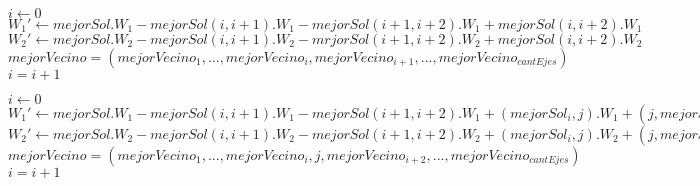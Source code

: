 \begin{flushleft}
 \begin{figure}[H]
  \begin{pseudo}
   \State $i \leftarrow 0$
	  \State $W_1' \leftarrow mejorSol.W_1 - mejorSol(i,i+1).W_1 - mejorSol(i+1,i+2).W_1 + mejorSol(i,i+2).W_1$
	  \State $W_2' \leftarrow mejorSol.W_2 - mejorSol(i,i+1).W_2 - mrjorSol(i+1,i+2).W_2 + mejorSol(i,i+2).W_2$
	    \State $mejorVecino = (mejorVecino_1, ... ,mejorVecino_i, mejorVecino_{i+1}, ..., mejorVecino_{cantEjes})$
	  \EndIf
      \EndIf
      \State $i = i+1$
   \EndWhile
   \EndProcedure
  \end{pseudo}
 \end{figure}
\end{flushleft}

\begin{flushleft}
 \begin{figure}[H]
  \begin{pseudo}
   \State $i \leftarrow 0$
	  \State $W_1' \leftarrow mejorSol.W_1 - mejorSol(i,i+1).W_1 - mejorSol(i+1,i+2).W_1 + (mejorSol_i, j).W_1 + (j, mejorSol_{i+2}).W_1$
	  \State $W_2' \leftarrow mejorSol.W_2 - mejorSol(i,i+1).W_2 - mejorSol(i+1,i+2).W_2 + (mejorSol_i, j).W_2 + (j, mejorSol_{i+2}).W_2$
	    \State $mejorVecino = (mejorVecino_1, ... ,mejorVecino_i, j ,mejorVecino_{i+2}, ..., mejorVecino_{cantEjes})$
	  \EndIf
      \EndFor
      \State $i = i+1$
   \EndWhile
   \EndProcedure
  \end{pseudo}
 \end{figure}
\end{flushleft}

